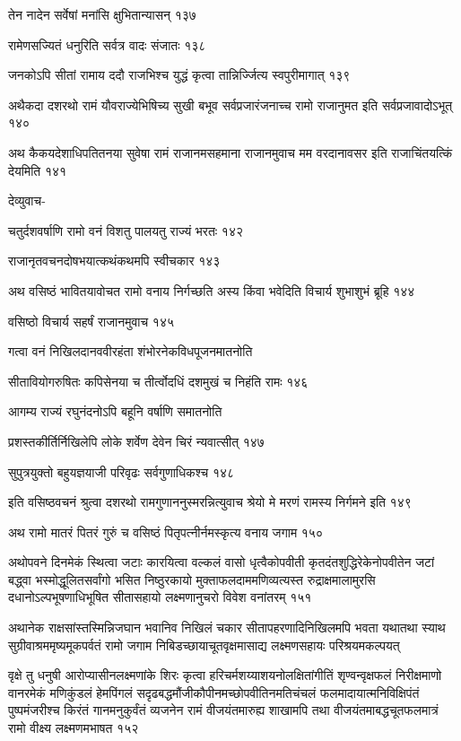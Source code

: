 तेन नादेन सर्वेषां मनांसि क्षुभितान्यासन् १३७

रामेणसज्यितं धनुरिति सर्वत्र वादः संजातः १३८

जनकोऽपि सीतां रामाय ददौ राजभिश्च युद्धं कृत्वा तान्निर्ज्जित्य स्वपुरीमागात् १३९

अथैकदा दशरथो रामं यौवराज्येभिषिच्य सुखी बभूव सर्वप्रजारंजनाच्च रामो राजानुमत इति
सर्वप्रजावादोऽभूत् १४०

अथ कैकयदेशाधिपतितनया सुवेषा रामं राजानमसहमाना राजानमुवाच मम वरदानावसर इति
राजाचिंतयत्किं देयमिति १४१

देव्युवाच-

चतुर्दशवर्षाणि रामो वनं विशतु पालयतु राज्यं भरतः १४२

राजानृतवचनदोषभयात्कथंकथमपि स्वीचकार १४३

अथ वसिष्ठं भावितयावोचत रामो वनाय निर्गच्छति अस्य किंवा भवेदिति विचार्य शुभाशुभं
ब्रूहि १४४

वसिष्ठो विचार्य सहर्षं राजानमुवाच १४५

गत्वा वनं निखिलदानववीरहंता शंभोरनेकविधपूजनमातनोति

सीतावियोगरुषितः कपिसेनया च तीर्त्वोदधिं दशमुखं च निहंति रामः १४६

आगम्य राज्यं रघुनंदनोऽपि बहूनि वर्षाणि समातनोति

प्रशस्तकीर्तिर्निखिलेपि लोके शर्वेण देवेन चिरं न्यवात्सीत् १४७

सुपुत्रयुक्तो बहुयज्ञयाजी परिवृढः सर्वगुणाधिकश्च १४८

इति वसिष्ठवचनं श्रुत्वा दशरथो रामगुणाननुस्मरन्नित्युवाच श्रेयो मे मरणं रामस्य निर्गमने इति
 १४९

अथ रामो मातरं पितरं गुरुं च वसिष्ठं पितृपत्नीर्नमस्कृत्य वनाय जगाम १५०

अथोपवने दिनमेकं स्थित्वा जटाः कारयित्वा वल्कलं वासो धृत्वैकोपवीती कृतदंतशुद्धिरेकेनोपवीतेन
जटां बद्ध्वा भस्मोद्धूलितसर्वांगो भसित निष्ठुरकायो मुक्ताफलदाममणिव्यत्यस्त
रुद्राक्षमालामुरसि दधानोऽल्पभूषणाधिभूषित सीतासहायो लक्ष्मणानुचरो विवेश वनांतरम् १५१

अथानेक राक्षसांस्तस्मिन्निजघान भवानिव निखिलं चकार सीतापहरणादिनिखिलमपि भवता
यथातथा स्याथ सुग्रीवाश्रममृष्यमूकपर्वतं रामो जगाम निबिडच्छायाचूतवृक्षमासाद्य
लक्ष्मणसहायः परिश्रयमकल्पयत्

वृक्षे तु धनुषी आरोप्यासीनलक्ष्मणांके शिरः कृत्वा हरिचर्मशय्याशयनोलक्षितांगीतिं शृण्वन्वृक्षफलं
निरीक्षमाणो वानरमेकं मणिकुंडलं हेमपिंगलं सदृढबद्धमौंजीकौपीनमच्छोपवीतिनमतिचंचलं
फलमादायात्मनिविक्षिपंतं पुष्पमंजरीश्च किरंतं गानमनुकुर्वंतं व्यजनेन रामं वीजयंतमारुह्य
शाखामपि तथा वीजयंतमाबद्धचूतफलमात्रं रामो वीक्ष्य लक्ष्मणमभाषत १५२


